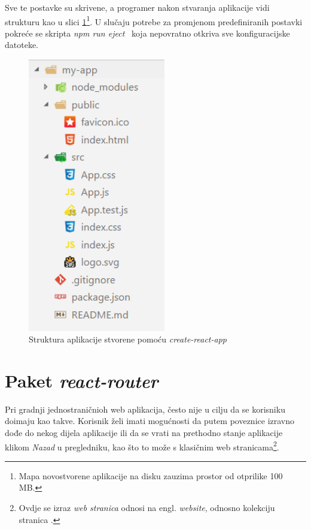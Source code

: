 \documentclass[times, utf8, zavrsni, numeric]{fer}
\newcommand{\razmaks}{\vspace{10pt}}
\begin{document}
Sve te postavke su skrivene, a programer nakon stvaranja aplikacije vidi strukturu kao u slici \ref{fig:app-structure}\footnote{Mapa novostvorene aplikacije na disku zauzima prostor od otprilike 100 MB.}.
U slučaju potrebe za promjenom predefiniranih postavki pokreće se skripta \glqq \emph{npm run eject}\grqq ~ koja nepovratno otkriva sve konfiguracijske datoteke.

\razmaks

\begin{figure}[htb]
\centering
\includegraphics[width=6cm]{img/app-structure.png}
\caption{Struktura aplikacije stvorene pomoću \emph{create-react-app}}
\label{fig:app-structure}
\end{figure}

\newpage


\section{Paket \emph{react-router}} \label{sec:react-router}

Pri gradnji jednostraničnioh web aplikacija, često nije u cilju da se korisniku doimaju kao takve.
Korisnik želi imati mogućnosti da putem poveznice izravno dođe do nekog dijela aplikacije ili da se vrati na prethodno stanje aplikacije klikom \emph{Nazad} u pregledniku, kao što to može s klasičnim web stranicama\footnote{Ovdje se izraz \emph{web stranica} odnosi na engl. \emph{website}, odnosno kolekciju stranica .}.
\end{document}
